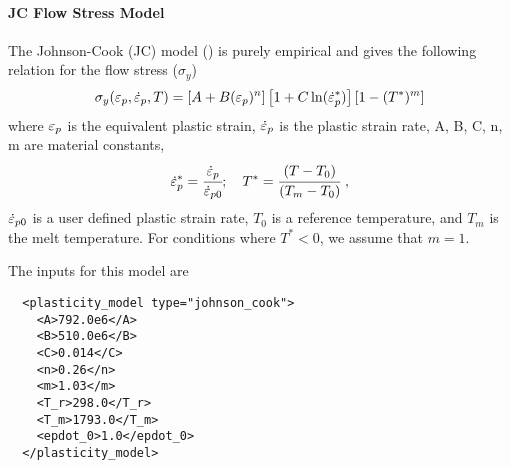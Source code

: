   \paragraph{JC Flow Stress Model}
  The Johnson-Cook (JC) model (\cite{Johnson1983}) is purely empirical and gives 
  the following relation for the flow stress ($\sigma_y$) 
  \begin{equation}
    \sigma_y(\varepsilon_p,\dot{\varepsilon}_{p},T) = 
    \left[A + B (\varepsilon_p)^n\right]\left[1 + C \ln(\dot{\varepsilon}_{p}^{*})\right]
    \left[1 - (T^*)^m\right]
  \end{equation}
  where $\varepsilon_p$ is the equivalent plastic strain, $\dot{\varepsilon}_{p}$ is the 
  plastic strain rate, A, B, C, n, m are material constants, 
  \begin{equation}
    \dot{\varepsilon}_{p}^{*} = \cfrac{\dot{\varepsilon}_{p}}{\dot{\varepsilon}_{p0}}; \quad
    T^* = \cfrac{(T-T_0)}{(T_m-T_0)}~,
  \end{equation}
  $\dot{\varepsilon}_{p0}$ is a user defined plastic strain rate, 
  $T_0$ is a reference temperature, and $T_m$ is the melt temperature.  
  For conditions where $T^* < 0$, we assume that $m = 1$.

  The inputs for this model are
  \lstset{language=XML}
  \begin{lstlisting}
  <plasticity_model type="johnson_cook">
    <A>792.0e6</A>
    <B>510.0e6</B>
    <C>0.014</C>
    <n>0.26</n>
    <m>1.03</m>
    <T_r>298.0</T_r>
    <T_m>1793.0</T_m>
    <epdot_0>1.0</epdot_0>
  </plasticity_model>
  \end{lstlisting}

